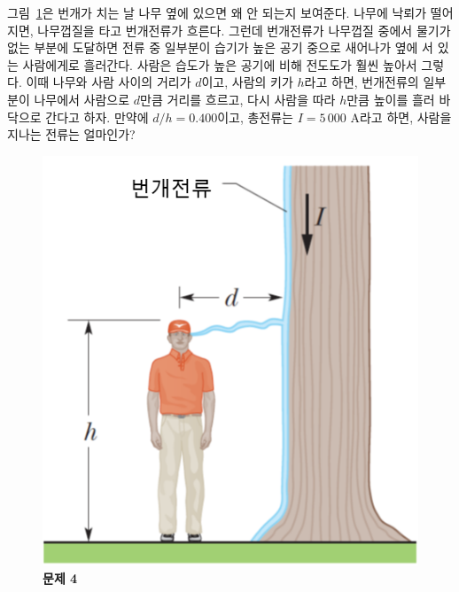 \documentclass[tightenlines,floatfix,nofootinbib,superscriptaddress,fleqn]{revtex4}
\begin{document}
그림~\ref{fig:1}은 번개가 치는 날 나무 옆에 있으면 왜 안 되는지
보여준다. 나무에 낙뢰가 떨어지면, 나무껍질을 타고 번개전류가 흐른다.
그런데 번개전류가 나무껍질 중에서 물기가 없는 부분에 도달하면 전류 중
일부분이 습기가 높은 공기 중으로 새어나가 옆에 서 있는 사람에게로
흘러간다. 사람은 습도가 높은 공기에 비해 전도도가 훨씬 높아서
그렇다. 이때 나무와 사람 사이의 거리가 $d$이고, 사람의 키가 $h$라고
하면, 번개전류의 일부분이 나무에서 사람으로 $d$만큼 거리를 흐르고,
다시 사람을 따라 $h$만큼 높이를 흘러 바닥으로 간다고 하자. 만약에
$d/h=0.400$이고, 총전류는 $I=5\,000$ A라고 하면, 사람을 지나는 전류는
얼마인가? 

\begin{figure}[htp]
  \centering
  \includegraphics[scale=0.45]{qfig5-20220914-1.png}
  \caption{\textbf{문제 4}}
  \label{fig:1}
\end{figure}

\vspace{0.5cm}


\vspace{0.5cm}
\end{document}
